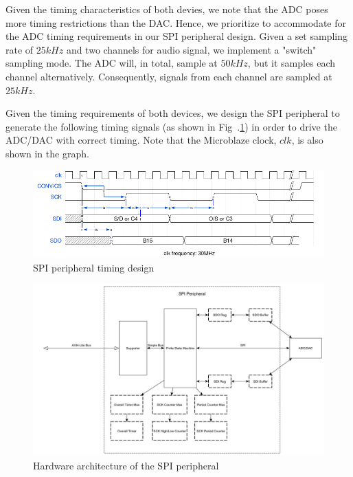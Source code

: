 \documentclass[conference]{IEEEtran}
\begin{document}
Given the timing characteristics of both devies, we note that the ADC poses more timing restrictions than the DAC. Hence, we prioritize to accommodate for the ADC timing requirements in our SPI peripheral design. Given a set sampling rate of $25kHz$ and two channels for audio signal, we implement a "switch" sampling mode. The ADC will, in total, sample at $50kHz$, but it samples each channel alternatively. Consequently, signals from each channel are sampled at $25kHz$. 

Given the timing requirements of both devices, we design the SPI peripheral to generate the following timing signals (as shown in Fig~.\ref{timing}) in order to drive the ADC/DAC with correct timing. Note that the Microblaze\textregistered{} clock, $clk$, is also shown in the graph.

\begin{figure}[htbp]
    \centerline{\includegraphics[width=\textwidth]{Figures/SPI/Screenshot from 2022-11-23 14-58-45.png}}
    \caption{SPI peripheral timing design}
    \label{timing}
\end{figure}

\begin{figure}[htbp]
    \centerline{\includegraphics[width=\textwidth]{Figures/SPI/hardware_architecture.jpg}}
    \caption{Hardware architecture of the SPI peripheral}
    \label{hardware}
\end{figure}
\end{document}

